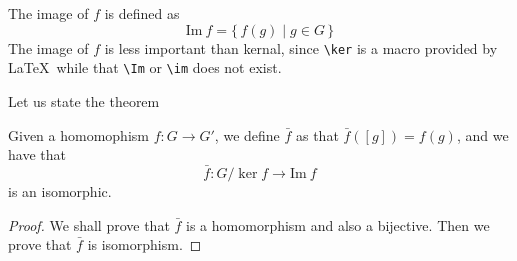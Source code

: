 \documentclass[../main.tex]{subfiles}
\begin{document}
\begin{definition}[Image]\label{def:Image}
The image of \(f\) is defined as 
\[
	\text{Im}\ f = \{ \, f (g) \mid g \in G\,\}
\]
The image of \(f\) is less important than kernal, since \verb|\ker| is a macro provided by \LaTeX\ while that \verb|\Im| or \verb|\im| does not exist.
\end{definition}
Let us state the theorem
\begin{thm}
\label{a basic theorem of quotients}
	Given a homomophism \(f \colon G \to G'\), we define \(\bar f\) as that \( \bar f ([g]) = f(g)\), and we have that 
	\[
		\bar f \colon G/ \ker f \to \text{Im}\ f
	\]
	is an isomorphic.
\end{thm}
\begin{proof}
	We shall prove that \(\bar f\) is a homomorphism and also a bijective. Then we prove that \(\bar f\) is isomorphism.
\end{proof}
\end{document}
